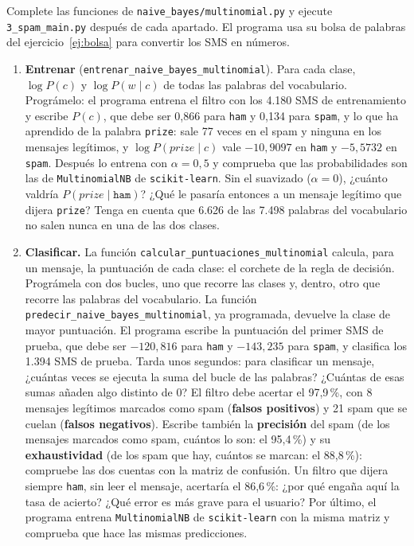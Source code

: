 \documentclass{article}
\begin{document}
\begin{exercise}[breakable]\label{ej:spam}
Complete las funciones de \texttt{naive\_bayes/multinomial.py} y ejecute \texttt{3\_spam\_main.py} después de cada apartado. El programa usa su bolsa de palabras del ejercicio~\ref{ej:bolsa} para convertir los SMS en números.
\begin{enumerate}
    \item[a)] \textbf{Entrenar} (\texttt{entrenar\_naive\_bayes\_multinomial}). Para cada clase, $\log P(c)$ y $\log P(w \mid c)$ de todas las palabras del vocabulario. Prográmelo: el programa entrena el filtro con los 4.180 SMS de entrenamiento y escribe $P(c)$, que debe ser 0,866 para \texttt{ham} y 0,134 para \texttt{spam}, y lo que ha aprendido de la palabra \texttt{prize}: sale 77 veces en el spam y ninguna en los mensajes legítimos, y $\log P(\textit{prize} \mid c)$ vale $-10{,}9097$ en \texttt{ham} y $-5{,}5732$ en \texttt{spam}. Después lo entrena con $\alpha = 0{,}5$ y comprueba que las probabilidades son las de \texttt{MultinomialNB} de \texttt{scikit-learn}. Sin el suavizado ($\alpha = 0$), ¿cuánto valdría $P(\textit{prize} \mid \texttt{ham})$? ¿Qué le pasaría entonces a un mensaje legítimo que dijera \texttt{prize}? Tenga en cuenta que 6.626 de las 7.498 palabras del vocabulario no salen nunca en una de las dos clases.
    \item[b)] \textbf{Clasificar.} La función \texttt{calcular\_puntuaciones\_multinomial} calcula, para un mensaje, la puntuación de cada clase: el corchete de la regla de decisión. Prográmela con dos bucles, uno que recorre las clases y, dentro, otro que recorre las palabras del vocabulario. La función \texttt{predecir\_naive\_bayes\_multinomial}, ya programada, devuelve la clase de mayor puntuación. El programa escribe la puntuación del primer SMS de prueba, que debe ser $-120{,}816$ para \texttt{ham} y $-143{,}235$ para \texttt{spam}, y clasifica los 1.394 SMS de prueba. Tarda unos segundos: para clasificar un mensaje, ¿cuántas veces se ejecuta la suma del bucle de las palabras? ¿Cuántas de esas sumas añaden algo distinto de 0? El filtro debe acertar el 97,9\,\%, con 8 mensajes legítimos marcados como spam (\textbf{falsos positivos}) y 21 spam que se cuelan (\textbf{falsos negativos}). Escribe también la \textbf{precisión} del spam (de los mensajes marcados como spam, cuántos lo son: el 95,4\,\%) y su \textbf{exhaustividad} (de los spam que hay, cuántos se marcan: el 88,8\,\%): compruebe las dos cuentas con la matriz de confusión. Un filtro que dijera siempre \texttt{ham}, sin leer el mensaje, acertaría el 86,6\,\%: ¿por qué engaña aquí la tasa de acierto? ¿Qué error es más grave para el usuario? Por último, el programa entrena \texttt{MultinomialNB} de \texttt{scikit-learn} con la misma matriz y comprueba que hace las mismas predicciones.

\end{enumerate}
\end{exercise}
\end{document}
